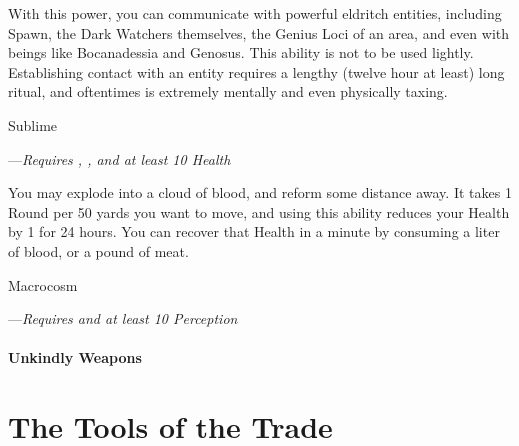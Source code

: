 \documentclass[oneside,11pt,english]{book}
\begin{document}
With this power, you can communicate 
with powerful eldritch entities, including Spawn, the Dark Watchers themselves, the Genius Loci 
of an area, and even with beings like Bocanadessia and Genosus. 
This ability is not to be used lightly. Establishing contact with an entity requires a lengthy (twelve 
hour at least) long ritual, and oftentimes is extremely mentally and even physically taxing.

\subparagraph{Sublime}\label{honor:Sublime}
---\quad \emph{Requires , , and at least 10 Health}

You may explode into a cloud 
of blood, and reform some distance away. It takes 1 Round per 50 yards you want to move, and 
using this ability reduces your Health by 1 for 24 hours. You can recover that Health in a minute 
by consuming a liter of blood, or a pound of meat. 

\subparagraph{Macrocosm}\label{honor:Macrocosm}
---\quad \emph{Requires  and at least 10 Perception}

\subsection{Unkindly Weapons}

\part[Gear and Equipment]{The Tools of the Trade}
\end{document}

